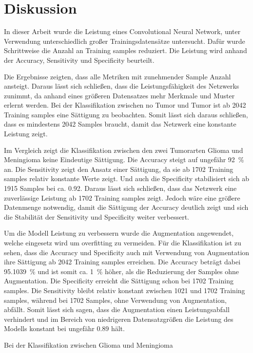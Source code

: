 \chapter{Diskussion}

In dieser Arbeit wurde die Leistung eines Convolutional Neural Network, unter Verwendung unterschiedlich großer Trainingsdatensätze untersucht.
Dafür wurde Schrittweise die Anzahl an Training samples reduziert. 
Die Leistung wird anhand der Accuracy, Sensitivity und Specificity beurteilt.

Die Ergebnisse zeigten, dass alle Metriken mit zunehmender Sample Anzahl ansteigt. 
Daraus lässt sich schließen, dass die Leistungsfähigkeit des Netzwerks zunimmt, da anhand eines größeren Datensatzes mehr Merkmale und Muster erlernt werden.
Bei der Klassifikation zwischen no Tumor und Tumor ist ab 2042 Training samples eine Sättigung zu beobachten.
Somit lässt sich daraus schließen, dass es mindestens 2042 Samples braucht, damit das Netzwerk eine konstante Leistung zeigt.

Im Vergleich zeigt die Klassifikation zwischen den zwei Tumorarten Glioma und Meningioma keine Eindeutige Sättigung. 
Die Accuracy steigt auf ungefähr \SI{92}{\percent} an.
Die Sensitivity zeigt den Ansatz einer Sättigung, da sie ab 1702 Training samples relativ konstante Werte zeigt.
Und auch die Specificity stabilisiert sich ab 1915 Samples bei ca. \SI{0,92}{}.
Daraus lässt sich schließen, dass das Netzwerk eine zuverlässige Leistung ab 1702 Training samples zeigt.
Jedoch wäre eine größere Datenmenge notwendig, damit die Sättigung der Accuracy deutlich zeigt und sich die Stabilität der Sensitivity und Specificity weiter verbessert. 

Um die Modell Leistung zu verbessern wurde die Augmentation angewendet, welche eingesetz wird um overfitting zu vermeiden.
Für die Klassifikation ist zu sehen, dass die Accuracy und Specificity auch mit Verwendung von Augmentation ihre Sättigung ab 2042 Training samples erreichen.
Die Accuracy beträgt dabei \SI{95.1039}{\percent} und ist somit ca. \SI{1}{\percent} höher, als die Reduzierung der Samples ohne Augmentation.
Die Specificity erreicht die Sättigung schon bei 1702 Training samples.
Die Sensitivity bleibt relativ konstant zwischen 1021 und 1702 Training samples, während bei 1702 Samples, ohne Verwendung von Augmentation, abfällt.
Somit lässt sich sagen, dass die Augmentation einen Leistungsabfall verhindert und im Bereich von niedrigeren Datensatzgrößen die Leistung des Modells konstant bei ungefähr 
\SI{0,89}{} hält.  

Bei der Klassifikation zwischen Glioma und Meningioma 